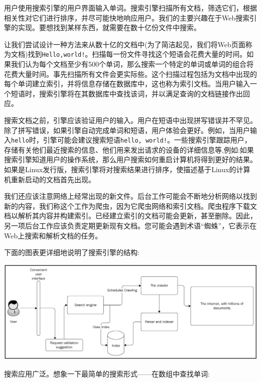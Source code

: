 用户使用搜索引擎的用户界面输入单词。搜索引擎扫描所有文档，筛选它们，根据相关性对它们进行排序，并尽可能快地响应用户。我们的主要兴趣在于Web搜索引擎的实现。要想找到某样东西，就需要在数十亿份文件中搜索。 \par
让我们尝试设计一种方法来从数十亿的文档中(为了简洁起见，我们将Web页面称为文档)找到\texttt{Hello,world!}。扫描每一份文件寻找这个短语会花费大量的时间。如果我们认为每个文档至少有500个单词，那么搜索一个特定的单词或单词的组合将花费大量时间。事先扫描所有文件会更实际些。这个扫描过程包括为文档中出现的每个单词建立索引，并将信息存储在数据库中，这也称为索引文档。当用户输入一个短语时，搜索引擎将在其数据库中查找该词，并以满足查询的文档链接作出回应。 \par
搜索文档之前，引擎应该验证用户的输入。用户在短语中出现拼写错误并不罕见。除了拼写错误，如果引擎自动完成单词和短语，用户体验会更好。例如，当用户输入\texttt{hello}时，引擎可能会建议搜索短语\texttt{hello, world!}。一些搜索引擎跟踪用户，存储有关他们最近搜索的信息、他们用来发出请求的设备的详细信息等,例如:如果搜索引擎知道用户的操作系统，那么用户搜索如何重启计算机将得到更好的结果。如果是Linux发行版，搜索引擎将对搜索结果进行排序，使描述基于Linux的计算机重新启动的文档首先出现。 \par
我们还应该注意网络上经常出现的新文件。后台工作可能会不断地分析网络以找到新的内容，我们称这个工作为爬虫，因为它爬虫网络和索引文档。爬虫程序下载文档以解析其内容并构建索引。已经建立索引的文档可能会更新，甚至删除。因此，另一项后台工作应该负责定期更新现有文档。您可能会遇到术语“蜘蛛”，它表示在Web上搜索和解析文档的任务。 \par
下面的图表更详细地说明了搜索引擎的结构: \par

\begin{center}
	\includegraphics[width=1.0\textwidth]{content/Section-3/Chapter-16/2}
\end{center}

搜索应用广泛。想象一下最简单的搜索形式——在数组中查找单词: \par

